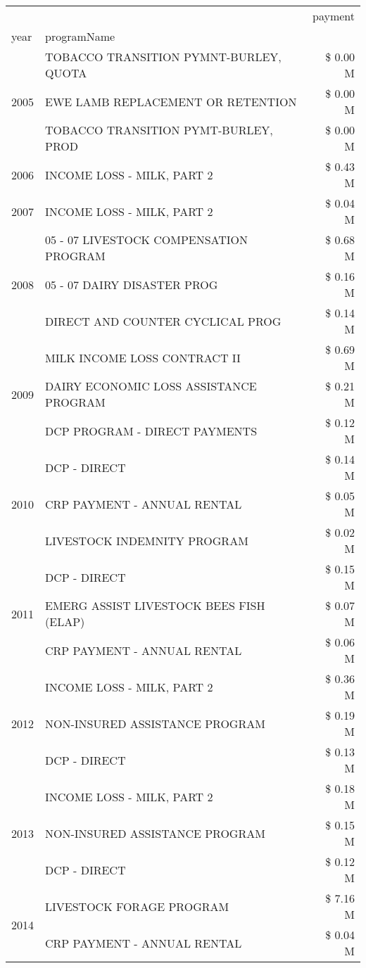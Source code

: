 \begin{tabular}{llr}
\toprule
 &  & payment \\
year & programName &  \\
\midrule
\multirow[t]{3}{*}{2005} & TOBACCO TRANSITION PYMNT-BURLEY, QUOTA & \$ 0.00 M \\
 & EWE LAMB REPLACEMENT OR RETENTION & \$ 0.00 M \\
 & TOBACCO TRANSITION PYMT-BURLEY, PROD & \$ 0.00 M \\
\cline{1-3}
2006 & INCOME LOSS - MILK, PART 2 & \$ 0.43 M \\
\cline{1-3}
2007 & INCOME LOSS - MILK, PART 2 & \$ 0.04 M \\
\cline{1-3}
\multirow[t]{3}{*}{2008} & 05 - 07 LIVESTOCK COMPENSATION PROGRAM & \$ 0.68 M \\
 & 05 - 07 DAIRY DISASTER PROG & \$ 0.16 M \\
 & DIRECT AND COUNTER CYCLICAL PROG & \$ 0.14 M \\
\cline{1-3}
\multirow[t]{3}{*}{2009} & MILK INCOME LOSS CONTRACT II & \$ 0.69 M \\
 & DAIRY ECONOMIC LOSS ASSISTANCE PROGRAM & \$ 0.21 M \\
 & DCP PROGRAM - DIRECT PAYMENTS & \$ 0.12 M \\
\cline{1-3}
\multirow[t]{3}{*}{2010} & DCP - DIRECT & \$ 0.14 M \\
 & CRP PAYMENT - ANNUAL RENTAL & \$ 0.05 M \\
 & LIVESTOCK INDEMNITY PROGRAM & \$ 0.02 M \\
\cline{1-3}
\multirow[t]{3}{*}{2011} & DCP - DIRECT & \$ 0.15 M \\
 & EMERG ASSIST LIVESTOCK BEES FISH (ELAP) & \$ 0.07 M \\
 & CRP PAYMENT - ANNUAL RENTAL & \$ 0.06 M \\
\cline{1-3}
\multirow[t]{3}{*}{2012} & INCOME LOSS - MILK, PART 2 & \$ 0.36 M \\
 & NON-INSURED ASSISTANCE PROGRAM & \$ 0.19 M \\
 & DCP - DIRECT & \$ 0.13 M \\
\cline{1-3}
\multirow[t]{3}{*}{2013} & INCOME LOSS - MILK, PART 2 & \$ 0.18 M \\
 & NON-INSURED ASSISTANCE PROGRAM & \$ 0.15 M \\
 & DCP - DIRECT & \$ 0.12 M \\
\cline{1-3}
\multirow[t]{3}{*}{2014} & LIVESTOCK FORAGE PROGRAM & \$ 7.16 M \\
 & CRP PAYMENT - ANNUAL RENTAL & \$ 0.04 M \\

\end{tabular}
